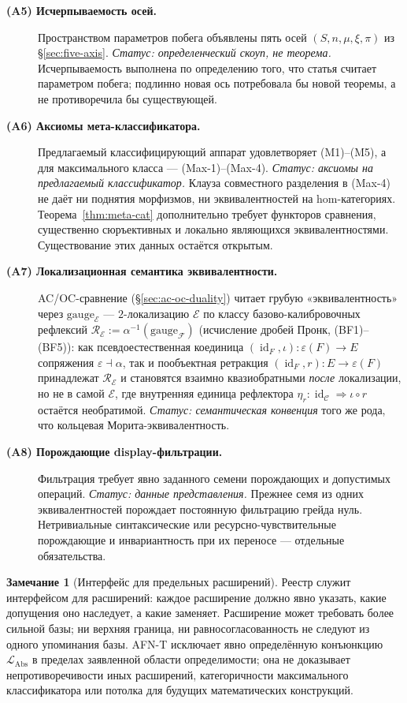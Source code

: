 \documentclass[11pt]{article}
\theoremstyle{plain}
\theoremstyle{definition}
\newtheorem{remark}[theorem]{Замечание}
\newcommand{\cF}{\mathcal{F}}
\newcommand{\cC}{\mathcal{C}}
\newcommand{\LAbs}{\mathcal{L}_{\mathrm{Abs}}}
\newcommand{\cE}{\mathcal{E}}
\DeclareMathOperator{\id}{id}
\begin{document}
\begin{description}
\item[\textbf{(A5) Исчерпываемость осей.}] Пространством параметров побега объявлены пять осей $(S, n, \mu, \xi, \pi)$ из \S\ref{sec:five-axis}. \emph{Статус: определенческий скоуп, не теорема.} Исчерпываемость выполнена по определению того, что статья считает параметром побега; подлинно новая ось потребовала бы новой теоремы, а не противоречила бы существующей.
\item[\textbf{(A6) Аксиомы мета-классификатора.}] Предлагаемый классифицирующий аппарат удовлетворяет (M1)--(M5), а для максимального класса — (Max-1)--(Max-4). \emph{Статус: аксиомы на предлагаемый классификатор.} Клауза совместного разделения в (Max-4) не даёт ни поднятия морфизмов, ни эквивалентностей на hom-категориях. Теорема~\ref{thm:meta-cat} дополнительно требует функторов сравнения, существенно сюръективных и локально являющихся эквивалентностями. Существование этих данных остаётся открытым.
\item[\textbf{(A7) Локализационная семантика эквивалентности.}] AC/OC-сравнение (\S\ref{sec:ac-oc-duality}) читает грубую «эквивалентность» через $\mathrm{gauge}_\cE$ — $2$-локализацию $\cE$ по классу базово-калибровочных рефлексий $\mathcal{R}_\cE := \alpha^{-1}(\mathrm{gauge}_\cF)$ (исчисление дробей Пронк, (BF1)--(BF5)): как псевдоестественная коединица $(\id_F, \iota) : \varepsilon(F) \to E$ сопряжения $\varepsilon \dashv \alpha$, так и пообъектная ретракция $(\id_F, r) : E \to \varepsilon(F)$ принадлежат $\mathcal{R}_\cE$ и становятся взаимно квазиобратными \emph{после} локализации, но не в самой $\cE$, где внутренняя единица рефлектора $\eta_r : \id_\cC \Rightarrow \iota \circ r$ остаётся необратимой. \emph{Статус: семантическая конвенция} того же рода, что кольцевая Морита-эквивалентность.
\item[\textbf{(A8) Порождающие display-фильтрации.}] Фильтрация требует явно заданного семени порождающих и допустимых операций. \emph{Статус: данные представления.} Прежнее семя из одних эквивалентностей порождает постоянную фильтрацию грейда нуль. Нетривиальные синтаксические или ресурсно-чувствительные порождающие и инвариантность при их переносе — отдельные обязательства.
\end{description}

\begin{remark}[Интерфейс для предельных расширений]\label{rem:register-interface}
Реестр служит интерфейсом для расширений: каждое расширение должно явно указать, какие допущения оно наследует, а какие заменяет. Расширение может требовать более сильной базы; ни верхняя граница, ни равносогласованность не следуют из одного упоминания базы. AFN-T исключает явно определённую конъюнкцию $\LAbs$ в пределах заявленной области определимости; она не доказывает непротиворечивости иных расширений, категоричности максимального классификатора или потолка для будущих математических конструкций.
\end{remark}
\end{document}
